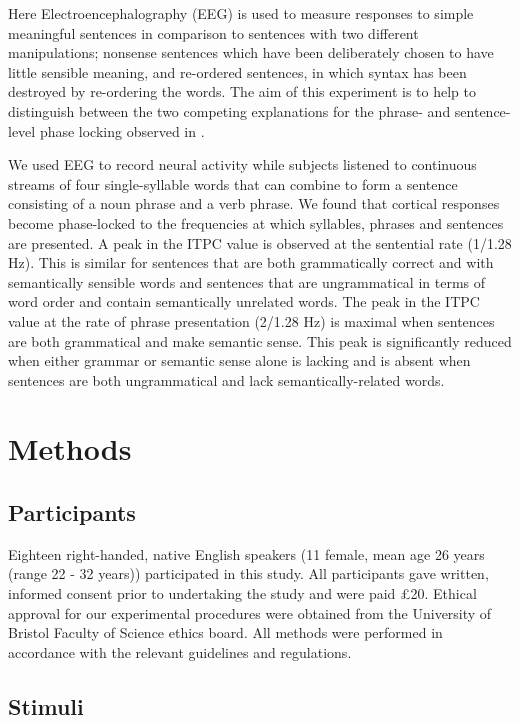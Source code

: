 \documentclass[a4paper,10pt,twoside]{article}
\begin{document}
Here Electroencephalography (EEG) is used to measure responses to
simple meaningful sentences in comparison to sentences with two different
manipulations; nonsense sentences which have been deliberately chosen
to have little sensible meaning, and re-ordered sentences, in which
syntax has been destroyed by re-ordering the words. The aim of this
experiment is to help to distinguish between the two competing
explanations for the phrase- and sentence-level phase locking observed
in \cite{DingEtAl2016,DingEtAl2017}.

We used EEG to record neural activity while subjects listened to continuous streams of four single-syllable words that can combine to form a sentence consisting of a noun phrase and a verb phrase. We found that cortical responses become phase-locked to the frequencies at which syllables, phrases and
sentences are presented. A peak in the ITPC value is observed at the sentential rate (1/1.28 Hz). This is similar for sentences that are both grammatically correct and with semantically sensible words and sentences that are ungrammatical in terms of word order and contain semantically
 unrelated words. The peak in the ITPC value at the rate of phrase presentation
 (2/1.28 Hz) is maximal when sentences are both grammatical and make
 semantic sense. This peak is significantly reduced when either grammar or
 semantic sense alone is lacking and is absent when sentences are both ungrammatical and
 lack semantically-related words. 


\section*{Methods}
\subsection*{Participants}

Eighteen right-handed, native English speakers (11 female, mean age 26
years (range 22 - 32 years)) participated in this study. All
participants gave written, informed consent prior to undertaking the
study and were paid £20. Ethical approval for our experimental procedures were obtained from the University of Bristol Faculty of Science ethics board. All methods were performed in accordance with the relevant guidelines and regulations.

\subsection*{Stimuli}
\end{document}

